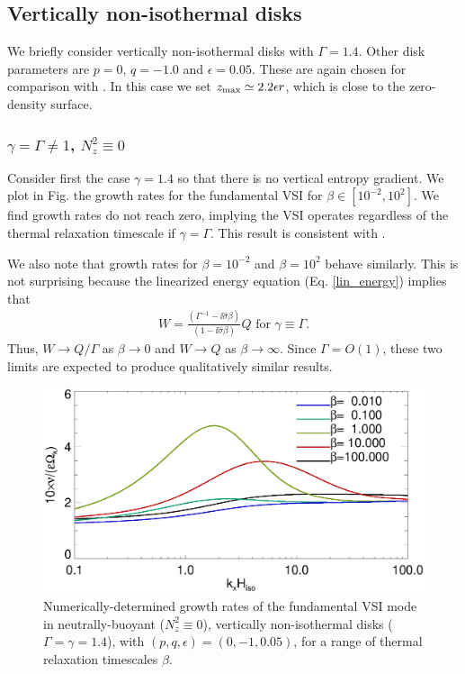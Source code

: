 
\subsection{Vertically non-isothermal disks}
We briefly consider vertically non-isothermal disks with
$\Gamma=1.4$. Other disk parameters are $p=0$, $q=-1.0$ and $\epsilon
= 0.05$. These are again chosen for comparison with \cite{nelson13}. 
In this case we set $z_\mathrm{max}\simeq2.2\epsilon r$, which is close to the
zero-density surface.     


\subsubsection{$\gamma=\Gamma \neq 1$, $N_z^2\equiv 0$}

Consider first the case $\gamma=1.4$ so that there is no vertical
entropy gradient. We plot in Fig. the growth rates for the
fundamental VSI for $\beta\in[10^{-2},10^{2}]$. We find growth rates
do not reach zero, implying the VSI operates regardless of the thermal
relaxation timescale if $\gamma=\Gamma$. This result is consistent
with \cite{nelson13}. 

We also note that growth rates for $\beta = 10^{-2}$ and
$\beta=10^{2}$ behave similarly. This is not surprising because
the linearized energy equation (Eq. \ref{lin_energy}) implies that 
\begin{align}
  W = \frac{\left(\Gamma^{-1} -
      \ii\hat{\sigma}\beta\right)}{\left(1-\ii\hat{\sigma}\beta\right)}
  Q \text{ for } \gamma\equiv \Gamma.   
\end{align}
Thus, $W \to Q/\Gamma$ as $\beta\to0$ and $W\to Q$ as
$\beta\to\infty$. Since $\Gamma=O(1)$, these two limits are expected
to produce qualitatively similar results.  

\begin{figure}
  \includegraphics[width=\linewidth,clip=true,trim=0cm 0cm 0cm
  0cm]{figures/growth_vnoniso1} 
  \caption{Numerically-determined growth rates of the fundamental VSI
    mode in neutrally-buoyant ($N_z^2\equiv0$), vertically non-isothermal disks
    ($\Gamma=\gamma=1.4$), with $(p,q,\epsilon)=(0,-1,0.05)$, for
    a range of thermal relaxation timescales 
    $\beta$. \label{growth_vnoniso1}}     
\end{figure} 

